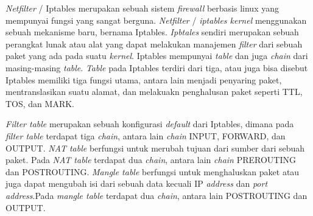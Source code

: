 \textit{Netfilter} / Iptables merupakan sebuah sistem \textit{firewall} berbasis linux yang mempunyai fungsi yang sangat berguna. \textit{Netfilter} / \textit{iptables kernel} menggunakan sebuah mekanisme baru, bernama Iptables. \textit{Ipbtales} sendiri merupakan sebuah perangkat lunak atau alat yang dapat melakukan manajemen \textit{filter} dari sebuah paket yang ada pada suatu \textit{kernel}. Iptables mempunyai \textit{table} dan juga \textit{chain} dari masing-masing \textit{table}. \textit{Table} pada Iptables terdiri dari tiga, atau juga bisa disebut Iptables memiliki tiga fungsi utama, antara lain menjadi penyaring paket, mentranslasikan suatu alamat, dan melakuakn penghalusan paket seperti TTL, TOS, dan MARK. \cite{bab2-iptables}

\textit{Filter table} merupakan sebuah konfigurasi \textit{default} dari Iptables, dimana pada \textit{filter table} terdapat tiga \textit{chain}, antara lain \textit{chain} INPUT, FORWARD, dan OUTPUT. \textit{NAT table} berfungsi untuk merubah tujuan dari sumber dari sebuah paket. Pada \textit{NAT table} terdapat dua \textit{chain}, antara lain \textit{chain} PREROUTING dan POSTROUTING. \textit{Mangle table} berfungsi untuk menghaluskan paket atau juga dapat mengubah isi dari sebuah data kecuali IP \textit{address} dan \textit{port address}.Pada \textit{mangle table} terdapat dua \textit{chain}, antara lain POSTROUTING dan OUTPUT.

